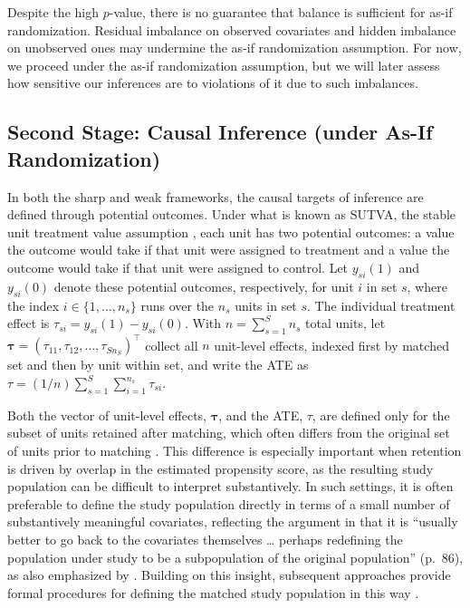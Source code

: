 \documentclass[
  12pt,
  leqno]{article}
\begin{document}
Despite the high \(p\)-value, there is no guarantee that balance is
sufficient for as-if randomization. Residual imbalance on observed
covariates and hidden imbalance on unobserved ones may undermine the
as-if randomization assumption. For now, we proceed under the as-if
randomization assumption, but we will later assess how sensitive our
inferences are to violations of it due to such imbalances.

\subsection{Second Stage: Causal Inference (under As-If
Randomization)}\label{second-stage-causal-inference-under-as-if-randomization}

In both the sharp and weak frameworks, the causal targets of inference
are defined through potential outcomes. Under what is known as SUTVA,
the stable unit treatment value assumption
\citep{rubin1980, rubin1986, cox1958}, each unit has two potential
outcomes: a value the outcome would take if that unit were assigned to
treatment and a value the outcome would take if that unit were assigned
to control. Let \(y_{si}(1)\) and \(y_{si}(0)\) denote these potential
outcomes, respectively, for unit \(i\) in set \(s\), where the index
\(i \in \{1, \ldots, n_s\}\) runs over the \(n_s\) units in set \(s\).
The individual treatment effect is
\(\tau_{si} = y_{si}(1) - y_{si}(0)\). With \(n = \sum_{s = 1}^S n_s\)
total units, let
\(\bm{\tau} = (\tau_{11}, \tau_{12}, \ldots, \tau_{Sn_S})^{\top}\)
collect all \(n\) unit-level effects, indexed first by matched set and
then by unit within set, and write the ATE as
\(\tau = (1/n) \sum_{s=1}^S \sum_{i=1}^{n_s} \tau_{si}\).

Both the vector of unit-level effects, \(\bm{\tau}\), and the ATE,
\(\tau\), are defined only for the subset of units retained after
matching, which often differs from the original set of units prior to
matching \citep{rosenbaumrubin1985, rosenbaum2012}. This difference is
especially important when retention is driven by overlap in the
estimated propensity score, as the resulting study population can be
difficult to interpret substantively. In such settings, it is often
preferable to define the study population directly in terms of a small
number of substantively meaningful covariates, reflecting the argument
in \citet{rosenbaum2010} that it is ``usually better to go back to the
covariates themselves \ldots{} perhaps redefining the population under
study to be a subpopulation of the original population'' (p.~86), as
also emphasized by \citet{stuart2010}. Building on this insight,
subsequent approaches provide formal procedures for defining the matched
study population in this way \citep{fogartyetal2016, traskinsmall2011}.
\end{document}

